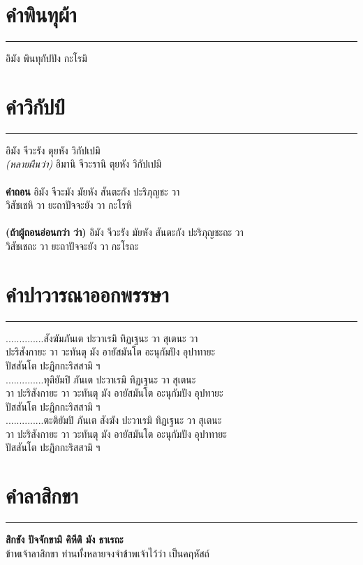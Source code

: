 \documentclass[12pt]{article}
\begin{document}
\pagebreak
\vspace*{\fill}
\begin{center}
\end{center}
\vspace{\fill}
\pagebreak

\section{คำพินทุผ้า}
\hrule
อิมัง พินทุกัปปัง กะโรมิ

\section{คำวิกัปป์}
\hrule
อิมัง จีวะรัง ตุยหัง วิกัปเปมิ  \\
\emph{(หลายผืนว่า)} อิมานิ จีวะรานิ ตุยหัง วิกัปเปมิ\\
\\
\textbf{คำถอน} อิมัง จีวะมัง มัยหัง สันตะกัง ปะริภุญชะ วา\\
วิสัชเชหิ วา ยะถาปัจจะยัง วา กะโรหิ\\
\\
\textbf{(ถ้าผู้ถอนอ่อนกว่า ว่า)} อิมัง จีวะรัง มัยหัง สันตะกัง ปะริภุญชะถะ วา\\
วิสัชเชถะ วา ยะถาปัจจะยัง วา กะโรถะ\\

\section{คำปาวารณาออกพรรษา}
\hrule
..............สังฆัมภันเต ปะวาเรมิ ทิฏเฐนะ วา สุเตนะ วา\\
ปะริสังกายะ วา วะทันตุ มัง อายัสมันโต อะนุกัมปัง อุปาทายะ\\
ปัสสันโต ปะฏิกกะริสสามิ ฯ\\
..............ทุติยัมปิ ภันเต ปะวาเรมิ ทิฏเฐนะ วา สุเตนะ\\
วา ปะริสังกายะ วา วะทันตุ มัง อายัสมันโต อะนุกัมปัง อุปทายะ\\
ปัสสันโต ปะฏิกกะริสสามิ ฯ\\
..............ตะติยัมปิ ภันเต สังฆัง ปะวาเรมิ ทิฏเฐนะ วา สุเตนะ\\
วา ปะริสังกายะ วา วะทันตุ มัง อายัสมันโต อะนุกัมปัง อุปาทายะ\\
ปัสสันโต ปะฏิกกะริสสามิ ฯ  \\

\section{คำลาสิกขา}
\hrule
\textbf{สิกขัง ปัจจักขามิ คิหีติ มัง ธาเรถะ}\\
\indent ข้าพเจ้าลาสิกขา ท่านทั้งหลายจงจำข้าพเจ้าไว้ว่า เป็นคฤหัสถ์
\end{document}

